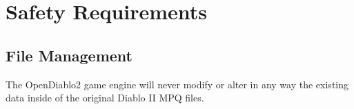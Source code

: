 \section{Safety Requirements} \label{sec:safety_requirements}


\subsection{File Management}
The OpenDiablo2 game engine will never modify or alter in any way the existing
data inside of the original Diablo II MPQ files.
